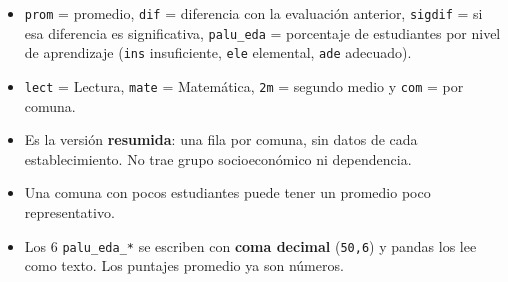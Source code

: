 \documentclass[10.5pt]{article}
\begin{document}
\begin{estrategiabox}
\begin{itemize}[leftmargin=1.1em,itemsep=2pt,topsep=2pt]
\item \texttt{prom} = promedio, \texttt{dif} = diferencia con la evaluación anterior, \texttt{sigdif} = si esa diferencia es significativa, \texttt{palu\_\allowbreak{}eda} = porcentaje de estudiantes por nivel de aprendizaje (\texttt{ins} insuficiente, \texttt{ele} elemental, \texttt{ade} adecuado).
\item \texttt{lect} = Lectura, \texttt{mate} = Matemática, \texttt{2m} = segundo medio y \texttt{com} = por comuna.
\end{itemize}
\end{estrategiabox}

\begin{alertabox}
\begin{itemize}[leftmargin=1.1em,itemsep=2pt,topsep=2pt]
\item Es la versión \textbf{resumida}: una fila por comuna, sin datos de cada establecimiento. No trae grupo socioeconómico ni dependencia.
\item Una comuna con pocos estudiantes puede tener un promedio poco representativo.
\item Los 6 \texttt{palu\_\allowbreak{}eda\_\allowbreak{}*} se escriben con \textbf{coma decimal} (\texttt{50,6}) y pandas los lee como texto. Los puntajes promedio ya son números.
\end{itemize}
\end{alertabox}

\newpage
{}\label{base5}\hypertarget{base5}{}
\end{document}
